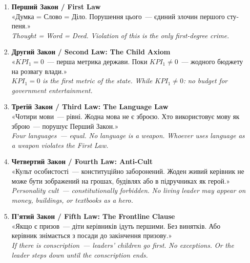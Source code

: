 \documentclass[11pt,a4paper]{article}
\theoremstyle{definition}
\theoremstyle{remark}
\begin{document}
\begin{tcolorbox}[enhanced, breakable,
  colback=sichyellow!8!white,
  colframe=sichblue,
  title={\foreignlanguage{russian}{\textbf{Конституція Нової Сечі
  / Constitution of the New Sich (Core Articles)}}},
  fonttitle=\bfseries, boxrule=1.5pt, arc=4pt]

\begin{enumerate}[leftmargin=1.5cm, itemsep=10pt]

  \item \textbf{\foreignlanguage{russian}{Перший Закон / First Law}}\\
    \foreignlanguage{russian}{
    «Думка = Слово = Діло.
    Порушення цього~--- єдиний злочин першого ступеня.»}\\
    \textit{Thought = Word = Deed.
    Violation of this is the only first-degree crime.}

  \item \textbf{\foreignlanguage{russian}{Другий Закон / Second Law:
    The Child Axiom}}\\
    \foreignlanguage{russian}{
    «$KPI_1 = 0$~--- перша метрика держави.
    Поки $KPI_1 \neq 0$~--- жодного бюджету на розвагу влади.»}\\
    \textit{$KPI_1 = 0$ is the first metric of the state.
    While $KPI_1 \neq 0$: no budget for government entertainment.}

  \item \textbf{\foreignlanguage{russian}{Третій Закон / Third Law:
    The Language Law}}\\
    \foreignlanguage{russian}{
    «Чотири мови~--- рівні.
    Жодна мова не є зброєю.
    Хто використовує мову як зброю~---
    порушує Перший Закон.»}\\
    \textit{Four languages~--- equal.
    No language is a weapon.
    Whoever uses language as a weapon violates the First Law.}

  \item \textbf{\foreignlanguage{russian}{Четвертий Закон / Fourth Law:
    Anti-Cult}}\\
    \foreignlanguage{russian}{
    «Культ особистості~--- конституційно заборонений.
    Жоден живий керівник не може бути зображений на грошах,
    будівлях або в підручниках як герой.»}\\
    \textit{Personality cult~--- constitutionally forbidden.
    No living leader may appear on money, buildings,
    or textbooks as a hero.}

  \item \textbf{\foreignlanguage{russian}{П'ятий Закон / Fifth Law:
    The Frontline Clause}}\\
    \foreignlanguage{russian}{
    «Якщо є призов~--- діти керівників ідуть першими.
    Без винятків.
    Або керівник знімається з посади до закінчення призову.»}\\
    \textit{If there is conscription~--- leaders' children go first.
    No exceptions.
    Or the leader steps down until the conscription ends.}


\end{enumerate}
\end{tcolorbox}
\end{document}
